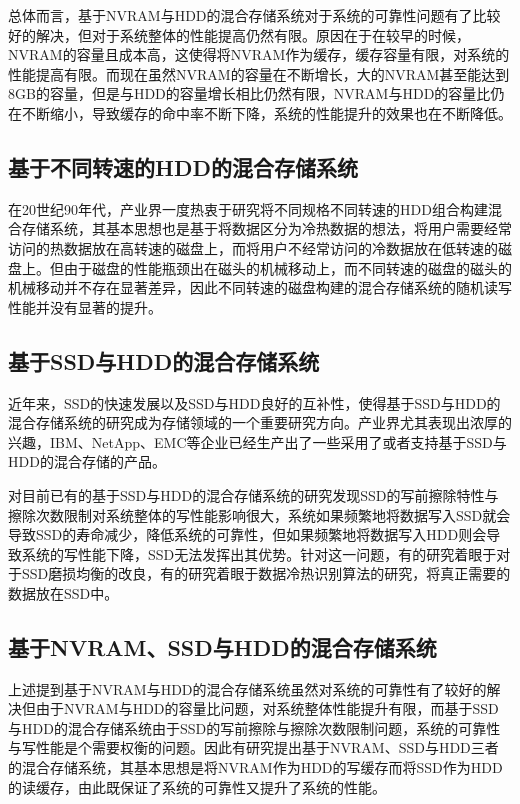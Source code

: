 总体而言，基于NVRAM与HDD的混合存储系统对于系统的可靠性问题有了比较好的解决，但对于系统整体的性能提高仍然有限。原因在于在较早的时候，NVRAM的容量且成本高，这使得将NVRAM作为缓存，缓存容量有限，对系统的性能提高有限。而现在虽然NVRAM的容量在不断增长，大的NVRAM甚至能达到8GB的容量，但是与HDD的容量增长相比仍然有限，NVRAM与HDD的容量比仍在不断缩小，导致缓存的命中率不断下降，系统的性能提升的效果也在不断降低。

\subsection{基于不同转速的HDD的混合存储系统}

在20世纪90年代，产业界一度热衷于研究将不同规格不同转速的HDD组合构建混合存储系统，其基本思想也是基于将数据区分为冷热数据的想法，将用户需要经常访问的热数据放在高转速的磁盘上，而将用户不经常访问的冷数据放在低转速的磁盘上。但由于磁盘的性能瓶颈出在磁头的机械移动上，而不同转速的磁盘的磁头的机械移动并不存在显著差异，因此不同转速的磁盘构建的混合存储系统的随机读写性能并没有显著的提升。

\subsection{基于SSD与HDD的混合存储系统}

近年来，SSD的快速发展以及SSD与HDD良好的互补性，使得基于SSD与HDD的混合存储系统的研究成为存储领域的一个重要研究方向。产业界尤其表现出浓厚的兴趣，IBM\cite{ibm2010ds8000}、NetApp\cite{netapp}、EMC\cite{laliberte2009automate}等企业已经生产出了一些采用了或者支持基于SSD与HDD的混合存储的产品。

对目前已有的基于SSD与HDD的混合存储系统的研究发现SSD的写前擦除特性与擦除次数限制对系统整体的写性能影响很大，系统如果频繁地将数据写入SSD就会导致SSD的寿命减少，降低系统的可靠性，但如果频繁地将数据写入HDD则会导致系统的写性能下降，SSD无法发挥出其优势。针对这一问题，有的研究着眼于对于SSD磨损均衡的改良\cite{王增辉2015磨损均衡在提高, 李恒恒2016基于, 陈晓敏2010基于}，有的研究着眼于数据冷热识别算法的研究\cite{刘庆宾2016面向多用户的, 闫林2014基于}，将真正需要的数据放在SSD中。

\subsection{基于NVRAM、SSD与HDD的混合存储系统}

上述提到基于NVRAM与HDD的混合存储系统虽然对系统的可靠性有了较好的解决但由于NVRAM与HDD的容量比问题，对系统整体性能提升有限，而基于SSD与HDD的混合存储系统由于SSD的写前擦除与擦除次数限制问题，系统的可靠性与写性能是个需要权衡的问题。因此有研究提出基于NVRAM、SSD与HDD三者的混合存储系统\cite{祝青2013混合存储系统研究}，其基本思想是将NVRAM作为HDD的写缓存而将SSD作为HDD的读缓存，由此既保证了系统的可靠性又提升了系统的性能。


